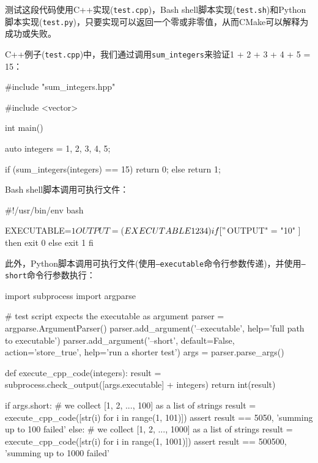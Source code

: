 测试这段代码使用C++实现(\texttt{test.cpp})，Bash shell脚本实现(\texttt{test.sh})和Python脚本实现(\texttt{test.py})，只要实现可以返回一个零或非零值，从而CMake可以解释为成功或失败。

C++例子(\texttt{test.cpp})中，我们通过调用\texttt{sum\_integers}来验证1 + 2 + 3 + 4 + 5 = 15：

\begin{codebox}[cpp]
#include "sum_integers.hpp"

#include <vector>

int main() {
    auto integers = {1, 2, 3, 4, 5};
    
  if (sum_integers(integers) == 15) {
        return 0;
    } else {
        return 1;
    }
}
\end{codebox}

Bash shell脚本调用可执行文件：

\begin{codebox}[shell]
#!/usr/bin/env bash

EXECUTABLE=$1

OUTPUT=$($EXECUTABLE 1 2 3 4)

if [ "$OUTPUT" = "10" ]
then
    exit 0
else
    exit 1
fi
\end{codebox}

此外，Python脚本调用可执行文件(使用\texttt{--executable}命令行参数传递)，并使用\texttt{--short}命令行参数执行：

\begin{codebox}[python]
import subprocess
import argparse

# test script expects the executable as argument
parser = argparse.ArgumentParser()
parser.add_argument('--executable',
                                         help='full path to executable')
parser.add_argument('--short',
                                         default=False,
                    action='store_true',
                    help='run a shorter test')
args = parser.parse_args()

def execute_cpp_code(integers):
    result = subprocess.check_output([args.executable] + integers)
    return int(result)

if args.short:
    # we collect [1, 2, ..., 100] as a list of strings
    result = execute_cpp_code([str(i) for i in range(1, 101)])
    assert result == 5050, 'summing up to 100 failed'
else:
    # we collect [1, 2, ..., 1000] as a list of strings
    result = execute_cpp_code([str(i) for i in range(1, 1001)])
    assert result == 500500, 'summing up to 1000 failed'
\end{codebox}

